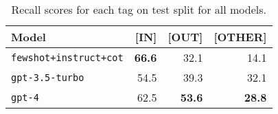 \begin{table}[t]
    \centering
    \begin{tabular}{lrrr}
        \toprule
        \textbf{Model} & \textbf{[IN]} & \textbf{[OUT]} & \textbf{[OTHER]} \\ \midrule
        \texttt{fewshot+instruct+cot} & \textbf{66.6} & 32.1 & 14.1 \\ 
        \texttt{gpt-3.5-turbo} & 54.5 & 39.3 & 32.1  \\
        \texttt{gpt-4} & 62.5 & \textbf{53.6} & \textbf{28.8}  \\ \bottomrule
    \end{tabular}
    \caption{Recall scores for each tag on test split for all models.}
    \label{tab:football-results-rec}
\end{table}
